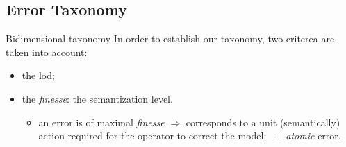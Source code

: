 \documentclass{beamer}
\begin{document}
        \subsection{Error Taxonomy}
            \begin{frame}{Bidimensional taxonomy}
                In order to establish our taxonomy, two criterea are taken into account:
                \begin{itemize}[label=$\blacktriangleright$, font=\color{IGNGreen}]
                    \item<1-> the \acrfull{lod};
                    \item<2-> the \emph{finesse}: the semantization level.
                    \begin{itemize}
                        \item<3-> an error is of maximal \emph{finesse} $\Rightarrow$ corresponds to a unit (semantically) action required for the operator to correct the model: $\equiv$ \emph{atomic} error.
                    \end{itemize}
                \end{itemize}
            \end{frame}
\end{document}

